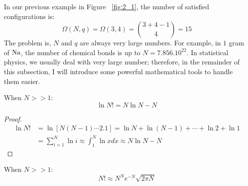 \documentclass[~/PhyAI/phyai.tex]{subfiles}
\begin{document}
In our previous example in Figure ~\ref{fig:2_1}, the number of satisfied configurations is:
$$ \Omega(N,q)=\Omega(3,4)=\binom{3+4-1}{4}=15 $$
The problem is, $N$ and $q$ are always very large numbers. For example, in $1$ gram of $\ce{Na}$, the number of chemical bonds is up to $N=7.856.10^{22}$. In statistical physics, we usually deal with very large number; therefore, in the remainder of this subsection, I will introduce some powerful mathematical tools to handle them easier.
\begin{theorem} When $N>>1$:
	$$\ln{N!}=N\ln{N}-N $$
	\label{Weak Stirling's Approximation}
\end{theorem}
\begin{proof}
	\begin{equation*}
		\begin{split}
			\ln{N!}&=\ln{[N(N-1)\cdots 2.1]}=\ln{N}+\ln{(N-1)}+\cdots+\ln{2}+\ln{1}\\
			&=\sum_{i=1}^{N}\ln{i}\approx\int_{1}^{N}\ln{x}dx\approx N\ln{N}-N
		\end{split}
	\end{equation*}

\end{proof}
\begin{theorem} When $N>>1$:
	$$    N!\approx N^{N}e^{-N}\sqrt{2\pi N}$$
\end{theorem}
\end{document}
